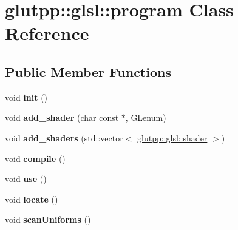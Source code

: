 \hypertarget{classglutpp_1_1glsl_1_1program}{\section{glutpp\-:\-:glsl\-:\-:program \-Class \-Reference}
\label{classglutpp_1_1glsl_1_1program}
}
\subsection*{\-Public \-Member \-Functions}
\begin{DoxyCompactItemize}
\item 
\hypertarget{classglutpp_1_1glsl_1_1program_a99ca8f6dd61152904e42afb7d1b459a3}{void {\bfseries init} ()}\label{classglutpp_1_1glsl_1_1program_a99ca8f6dd61152904e42afb7d1b459a3}

\item 
\hypertarget{classglutpp_1_1glsl_1_1program_a6cde9b2647b830ed62bb4bd34837d9fd}{void {\bfseries add\-\_\-shader} (char const $\ast$, \-G\-Lenum)}\label{classglutpp_1_1glsl_1_1program_a6cde9b2647b830ed62bb4bd34837d9fd}

\item 
\hypertarget{classglutpp_1_1glsl_1_1program_a222ee5c2b9f2f6896b6f7fe16b2864b0}{void {\bfseries add\-\_\-shaders} (std\-::vector$<$ \hyperlink{classglutpp_1_1glsl_1_1shader}{glutpp\-::glsl\-::shader} $>$)}\label{classglutpp_1_1glsl_1_1program_a222ee5c2b9f2f6896b6f7fe16b2864b0}

\item 
\hypertarget{classglutpp_1_1glsl_1_1program_aee7d2cd7b292e8dcbd7ebcdc704bfe63}{void {\bfseries compile} ()}\label{classglutpp_1_1glsl_1_1program_aee7d2cd7b292e8dcbd7ebcdc704bfe63}

\item 
\hypertarget{classglutpp_1_1glsl_1_1program_af94447e84217b4d222c9bc0104ae3ec8}{void {\bfseries use} ()}\label{classglutpp_1_1glsl_1_1program_af94447e84217b4d222c9bc0104ae3ec8}

\item 
\hypertarget{classglutpp_1_1glsl_1_1program_a0b7490fa9a0396a052d7d37140a551ab}{void {\bfseries locate} ()}\label{classglutpp_1_1glsl_1_1program_a0b7490fa9a0396a052d7d37140a551ab}

\item 
\hypertarget{classglutpp_1_1glsl_1_1program_a861dd1120f2e6b68fbfadc48bfdb4832}{void {\bfseries scan\-Uniforms} ()}\label{classglutpp_1_1glsl_1_1program_a861dd1120f2e6b68fbfadc48bfdb4832}


\end{DoxyCompactItemize}
